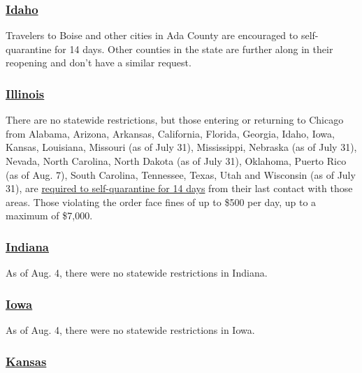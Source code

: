 \hypertarget{idaho}{%
\subsubsection{\texorpdfstring{\href{https://visitidaho.org/covid-19-travel-alert/}{Idaho}}{Idaho}}\label{idaho}}

Travelers to Boise and other cities in Ada County are encouraged to
self-quarantine for 14 days. Other counties in the state are further
along in their reopening and don't have a similar request.

\hypertarget{illinois}{%
\subsubsection{\texorpdfstring{\href{https://www.dph.illinois.gov/topics-services/diseases-and-conditions/diseases-a-z-list/coronavirus/travel-guidance}{Illinois}}{Illinois}}\label{illinois}}

There are no statewide restrictions, but those entering or returning to
Chicago from Alabama, Arizona, Arkansas, California, Florida, Georgia,
Idaho, Iowa, Kansas, Louisiana, Missouri (as of July 31), Mississippi,
Nebraska (as of July 31), Nevada, North Carolina, North Dakota (as of
July 31), Oklahoma, Puerto Rico (as of Aug. 7), South Carolina,
Tennessee, Texas, Utah and Wisconsin (as of July 31), are
\href{https://www.chicago.gov/city/en/sites/covid-19/home.html}{required
to self-quarantine for 14 days} from their last contact with those
areas. Those violating the order face fines of up to \$500 per day, up
to a maximum of \$7,000.

\hypertarget{indiana}{%
\subsubsection{\texorpdfstring{\href{https://www.coronavirus.in.gov}{Indiana}}{Indiana}}\label{indiana}}

As of Aug. 4, there were no statewide restrictions in Indiana.

\hypertarget{iowa}{%
\subsubsection{\texorpdfstring{\href{https://www.traveliowa.com/aspx/general/dynamicpage.aspx?id=204}{Iowa}}{Iowa}}\label{iowa}}

As of Aug. 4, there were no statewide restrictions in Iowa.

\hypertarget{kansas}{%
\subsubsection{\texorpdfstring{\href{https://www.coronavirus.kdheks.gov/175/Travel-Exposure-Related-Isolation-Quaran}{Kansas}}{Kansas}}\label{kansas}}

